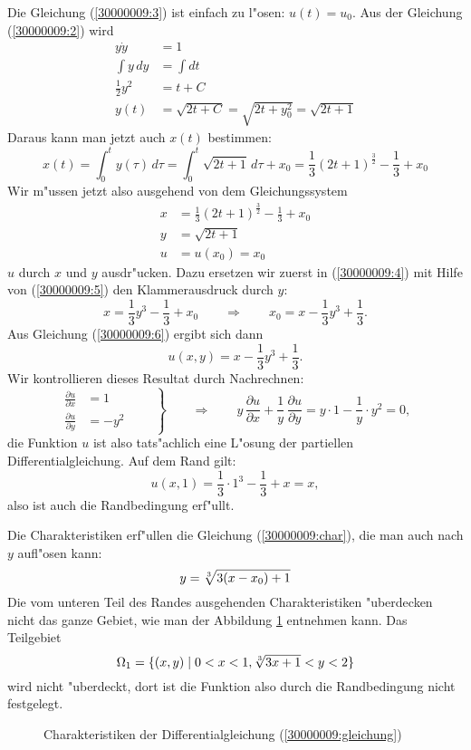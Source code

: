\begin{loesung}
\begin{teilaufgaben}
Die Gleichung (\ref{30000009:3}) ist einfach zu l"osen: $u(t)=u_0$.
Aus der Gleichung (\ref{30000009:2}) wird
\begin{align*}
y\dot y&=1\\
\int y\,dy&=\int dt\\
\frac12y^2&=t+C\\
y(t)&=\sqrt{2t+C}=\sqrt{2t+y_0^2}=\sqrt{2t+1}
\end{align*}
Daraus kann man jetzt auch $x(t)$ bestimmen:
\[
x(t)= \int_0^ty(\tau)\,d\tau
=\int_0^t\sqrt{2t+1}\,d\tau + x_0
=\frac13(2t+1)^{\frac{3}{2}}-\frac13+x_0
\]
Wir m"ussen jetzt also ausgehend von dem Gleichungssystem
\begin{align}
x&=\frac13(2t+1)^{\frac32}-\frac13+x_0\label{30000009:4}\\
y&=\sqrt{2t+1}\label{30000009:5}\\
u&=u(x_0)=x_0\label{30000009:6}
\end{align}
$u$ durch $x$ und $y$ ausdr"ucken. Dazu ersetzen wir zuerst in 
(\ref{30000009:4}) mit Hilfe von (\ref{30000009:5}) den Klammerausdruck
durch $y$:
\begin{equation}
x=\frac13y^3-\frac13+x_0\qquad\Rightarrow\qquad x_0=x-\frac13y^3+\frac13.
\label{30000009:char}
\end{equation}
Aus Gleichung (\ref{30000009:6}) ergibt sich dann
\[
u(x,y)=x-\frac13y^3+\frac13.
\]
Wir kontrollieren dieses Resultat durch Nachrechnen:
\[
\left.
\begin{aligned}
\frac{\partial u}{\partial x}
&=
1
\\
\frac{\partial u}{\partial y}
&=
-y^2
\end{aligned}
\qquad
\right\}
\qquad
\Rightarrow
\qquad
y\,\frac{\partial u}{\partial x}
+\frac1y\,\frac{\partial u}{\partial y}
=
y\cdot 1-\frac1y\cdot y^2=0,
\]
die Funktion $u$ ist also tats"achlich eine L"osung der partiellen
Differentialgleichung. Auf dem Rand gilt:
\[
u(x,1)=\frac13\cdot1^3-\frac13+x=x,
\]
also ist auch die Randbedingung erf"ullt.
\item
Die Charakteristiken erf"ullen die Gleichung (\ref{30000009:char}), die
man auch nach $y$ aufl"osen kann:
\[
y=\root3\of{3(x-x_0)+1}
\]
Die vom unteren Teil des Randes ausgehenden Charakteristiken "uberdecken
nicht das ganze Gebiet, wie man der Abbildung \ref{30000009:charakteristiken}
entnehmen kann. Das Teilgebiet 
\[
\Omega_1=\{(x,y)\;|\; 0<x<1, \root3\of{3x+1} < y < 2\}
\]
wird nicht "uberdeckt, dort ist die Funktion also durch die Randbedingung
nicht festgelegt.
\end{teilaufgaben}
\begin{figure}
\begin{center}
\end{center}
\caption{Charakteristiken der Differentialgleichung (\ref{30000009:gleichung})
\label{30000009:charakteristiken}}
\end{figure}
\end{loesung}

